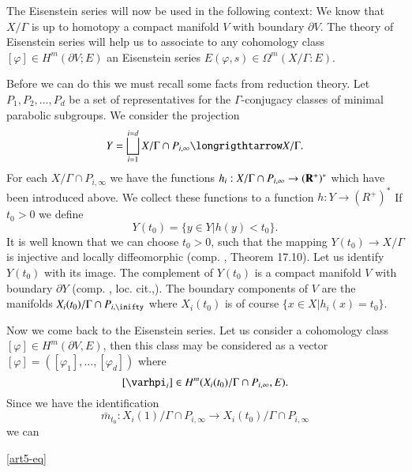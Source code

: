 The Eisenstein series will now be used in the following context: We know that $X/ \Gamma$ is up to homotopy a compact manifold $V$ with boundary $\partial V$. The theory of Eisenstein series will help us to associate to any cohomology class $[\varphi] \in H^m (\partial V; E)$ an Eisenstein series $E(\varphi, s) \in \Omega^m (X/\Gamma : E)$.

Before we can do this we must recall some facts from reduction theory. Let $P_1, P_2, \ldots, P_d$ be a set of representatives for the $\Gamma$-conjugacy classes of minimal parabolic subgroups. We consider the projection
$$
Y = \bigsqcup^{i=d}_{i=1} X / \Gamma \cap P_{i, \infty} \longrigthtarrow X / \Gamma.
$$
For each $X/ \Gamma \cap P_{i, \infty}$ we have the functions $h_i: X/ \Gamma \cap P_{i, \infty} \to (\mathbf{R}^+)^\ast$ which have been introduced above. We collect these functions to a function $h: Y \longrightarrow (R^+)^\ast$ If $t_0 > 0$ we define 
$$
Y(t_0) = \{y \in Y | h (y) < t_0\}.
$$
It is well known that we can choose $t_0 > 0$, such that the mapping $Y(t_0) \longrightarrow X/ \Gamma$ is injective and locally diffeomorphic (comp. \cite{art5-key2}, Theorem 17.10). Let us identify $Y(t_0)$ with its image. The complement of $Y(t_0)$ is a compact manifold $V$ with boundary $\partial Y$ (comp. \cite{art5-key2}, loc. cit.,). The boundary components of $V$ are the manifolds $X_i (t_0)/\Gamma \cap P_{i, \inifty}$ where $X_i (t_0)$ is of course $\{x \in X | h_i (x) = t_0\}$.

Now we come back to the Eisenstein series. Let us consider a cohomology class $[\varphi] \in H^m (\partial V, E)$, then this class may be considered as a vector $[\varphi] = ([\varphi_1], \ldots, [\varphi_d])$ where
$$
[\varhpi_i] \in H^m (X_i (t_0) / \Gamma \cap P_{i, \infty}, E).
$$
Since we have the identification
$$
\bar{m}_{t_0} : X_i (1) / \Gamma \cap P_{i,\infty} \longrightarrow X_i (t_0) / \Gamma \cap P_{i, \infty}
$$
we can\pageoriginale




\eqref{art5-eq}




